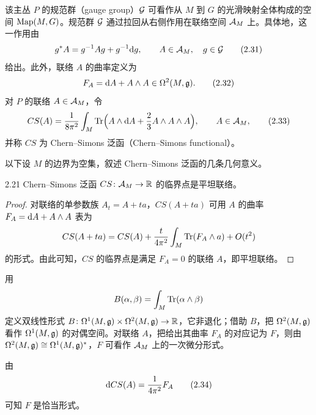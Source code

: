 
该主丛 $P$ 的规范群（gauge group）$\mathcal{G}$ 可看作从 $M$ 到 $G$ 的光滑映射全体构成的空间 $\operatorname{Map}(M,G)$。规范群 $\mathcal{G}$ 通过拉回从右侧作用在联络空间 $\mathcal{A}_M$ 上。具体地，这一作用由
\begin{equation}
  g^{*}A=g^{-1}Ag+g^{-1}\mathrm{d} g,\qquad A\in\mathcal{A}_M,\quad g\in\mathcal{G} \tag{2.31}
\end{equation}
给出。此外，联络 $A$ 的曲率定义为
\begin{equation}
  F_A=\mathrm{d} A+A\wedge A\in\Omega^{2}(M,\mathfrak{g}). \tag{2.32}
\end{equation}
对 $P$ 的联络 $A\in\mathcal{A}_M$，令
\begin{equation}
  CS(A)=\frac{1}{8\pi^{2}}\int_{M}\operatorname{Tr}\Bigl(A\wedge \mathrm{d} A+\frac{2}{3}A\wedge A\wedge A\Bigr),\qquad A\in\mathcal{A}_M, \tag{2.33}
\end{equation}
并称 $CS$ 为 Chern--Simons 泛函（Chern--Simons functional）。

以下设 $M$ 的边界为空集，叙述 Chern--Simons 泛函的几条几何意义。

\begin{proposition*}{2.21}
  Chern--Simons 泛函 $CS\colon\mathcal{A}_M\to\mathbb{R}$ 的临界点是平坦联络。
\end{proposition*}

\begin{proof}
  对联络的单参数族 $A_t=A+ta$，$CS(A+ta)$ 可用 $A$ 的曲率 $F_A=\mathrm{d} A+A\wedge A$ 表为
  \begin{equation*}
    CS(A+ta)=CS(A)+\frac{t}{4\pi^{2}}\int_{M}\operatorname{Tr}(F_A\wedge a)+O(t^{2})
  \end{equation*}
  的形式。由此可知，$CS$ 的临界点是满足 $F_A=0$ 的联络 $A$，即平坦联络。
\end{proof}

用
\begin{equation*}
  B(\alpha,\beta)=\int_{M}\operatorname{Tr}(\alpha\wedge\beta)
\end{equation*}
定义双线性形式 $B\colon\Omega^{1}(M,\mathfrak{g})\times\Omega^{2}(M,\mathfrak{g})\to\mathbb{R}$，它非退化；借助 $B$，把 $\Omega^{2}(M,\mathfrak{g})$ 看作 $\Omega^{1}(M,\mathfrak{g})$ 的对偶空间。对联络 $A$，把给出其曲率 $F_A$ 的对应记为 $F$，则由 $\Omega^{2}(M,\mathfrak{g})\cong\Omega^{1}(M,\mathfrak{g})^{*}$，$F$ 可看作 $\mathcal{A}_M$ 上的一次微分形式。


由
\begin{equation}
  \mathrm{d} CS(A)=\frac{1}{4\pi^{2}}F_A \tag{2.34}
\end{equation}
可知 $F$ 是恰当形式。


